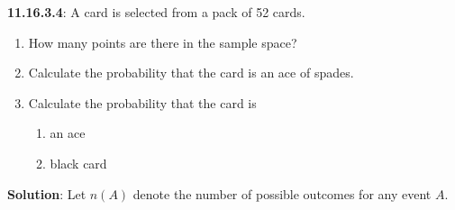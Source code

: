 \documentclass[journal,12pt,twocolumn]{IEEEtran}
\begin{document}
\bigskip
\renewcommand{\thefigure}{\theenumi}
\renewcommand{\thetable}{\theenumi}
\textbf{11.16.3.4}:
A card is selected from a pack of 52 cards.
\begin{enumerate}[label=(\alph*)]
	\item
		How many points are there in the sample space?
	\item
		Calculate the probability that the card is an ace of spades.
	\item
		Calculate the probability that the card is \begin{enumerate}[label=\roman*)]
								\item
									an ace
								\item
									black card
							   \end{enumerate}
\end{enumerate}
\textbf{Solution}:
Let $n(A)$ denote the number of possible outcomes for any event $A$.
\end{document}
